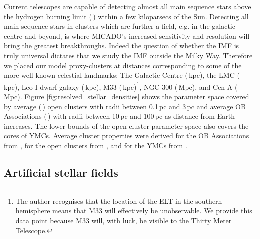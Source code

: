 Current telescopes are capable of detecting almost all main sequence stars above the hydrogen burning limit (\,\msune) within a few kiloparsecs of the Sun. Detecting all main sequence stars in clusters which are further a field, e.g. in the galactic centre and beyond, is where MICADO's increased sensitivity and resolution will bring the greatest breakthroughs. Indeed the question of whether the IMF is truly universal dictates that we study the IMF outside the Milky Way. Therefore we placed our model proxy-clusters at distances corresponding to some of the more well known celestial landmarks: The Galactic Centre (\,kpc), the LMC (\,kpc), Leo I dwarf galaxy (\,kpc), M33 (\,kpc)\footnote{The author recognises that the location of the ELT in the southern hemisphere means that M33 will effectively be unobservable. We provide this data point because M33 will, with luck, be visible to the Thirty Meter Telescope.}, NGC 300 (\,Mpc), and Cen A (\,Mpc). Figure \ref{fig:resolved_stellar_densities} shows the parameter space covered by average (\,\msun) open clusters with radii between 0.1\,pc and 3\,pc and average OB Associations (\,\msun) with radii between 10\,pc and 100\,pc as distance from Earth increases. The lower bounds of the open cluster parameter space also covers the cores of YMCs. Average cluster properties were derived for the OB Associations from \citet{melnik1995}, for the open clusters from \citet{piskunov2007}, and for the YMCs from \citet{portegies2010}.



\subsection{Artificial stellar fields}


